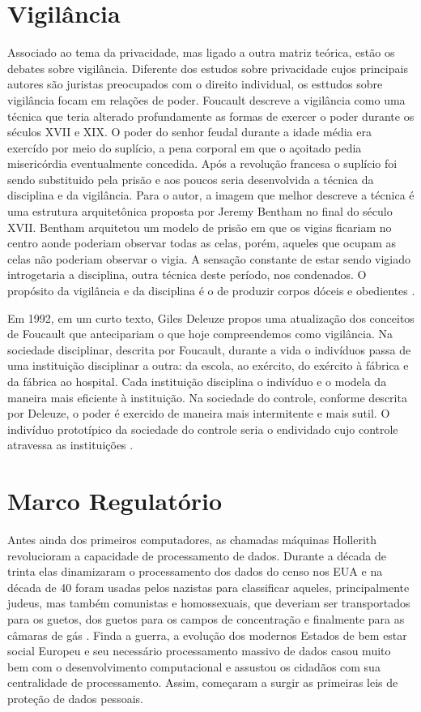 \section{Vigilância}
\label{sec:vigilancia}

Associado ao tema da privacidade, mas ligado a outra matriz teórica, estão os debates sobre vigilância.
Diferente dos estudos sobre privacidade cujos principais autores são juristas preocupados com o direito individual, os esttudos sobre vigilância focam em relações de poder.
Foucault descreve a vigilância como uma técnica que teria alterado profundamente as formas de exercer o poder durante os séculos XVII e XIX.
O poder do senhor feudal durante a idade média era exercído por meio do suplício, a pena corporal em que o açoitado pedia misericórdia eventualmente concedida.
Após a revolução francesa o suplício foi sendo substituido pela prisão e aos poucos seria desenvolvida a técnica da disciplina e da vigilância.
Para o autor, a imagem que melhor descreve a técnica é uma estrutura arquitetônica proposta por Jeremy Bentham no final do século XVII.
Bentham arquitetou um modelo de prisão em que os vigias ficariam no centro aonde poderiam observar todas as celas, porém, aqueles que ocupam as celas não poderiam observar o vigia.
A sensação constante de estar sendo vigiado introgetaria a disciplina, outra técnica deste período, nos condenados.
O propósito da vigilância e da disciplina é o de produzir corpos dóceis e obedientes \cite{}.

Em 1992, em um curto texto, Giles Deleuze propos uma atualização dos conceitos de Foucault que antecipariam o que hoje compreendemos como vigilância.
Na sociedade disciplinar, descrita por Foucault, durante a vida o indivíduos passa de uma instituição disciplinar a outra: da escola, ao exército, do exército à fábrica e da fábrica ao hospital.
Cada instituição disciplina o indivíduo e o modela da maneira mais eficiente à instituição.
Na sociedade do controle, conforme descrita por Deleuze, o poder é exercido de maneira mais intermitente e mais sutil.
O indivíduo prototípico da sociedade do controle seria o endividado cujo controle atravessa as instituições \cite{}.

\section{Marco Regulatório}
\label{sec:marco-regulatorio}

Antes ainda dos primeiros computadores, as chamadas máquinas Hollerith revolucioram a capacidade de processamento de dados.
Durante a década de trinta elas dinamizaram o processamento dos dados do censo nos EUA e na década de 40 foram usadas pelos nazistas para classificar aqueles, principalmente judeus, mas também comunistas e homossexuais, que deveriam ser transportados para os guetos, dos guetos para os campos de concentração e finalmente para as câmaras de gás \cite{}.
Finda a guerra, a evolução dos modernos Estados de bem estar social Europeu e seu necessário processamento massivo de dados casou muito bem com o desenvolvimento computacional e assustou os cidadãos com sua centralidade de processamento.
Assim, começaram a surgir as primeiras leis de proteção de dados pessoais.

